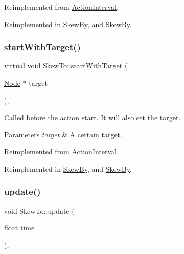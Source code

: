 Reimplemented from \hyperlink{classActionInterval_ad3d91186b2c3108488ddbbdbbd982484}{Action\+Interval}.



Reimplemented in \hyperlink{classSkewBy_aaf859fd8f95807064391ebeb6cd9243f}{Skew\+By}, and \hyperlink{classSkewBy_a8f9601dbf00d1a79972bcef59201bd32}{Skew\+By}.

\mbox{\label{classSkewTo_a16355f6807f0100f4e52ed8ad5e84116}} 
\subsubsection{\texorpdfstring{start\+With\+Target()}{startWithTarget()}\hspace{0.1cm}{\footnotesize\ttfamily [2/2]}}
{\footnotesize\ttfamily virtual void Skew\+To\+::start\+With\+Target (\begin{DoxyParamCaption}\item[{\hyperlink{classNode}{Node} $\ast$}]{target }\end{DoxyParamCaption})\hspace{0.3cm}{\ttfamily [override]}, {\ttfamily [virtual]}}

Called before the action start. It will also set the target.


\begin{DoxyParams}{Parameters}
{\em target} & A certain target. \\
\hline
\end{DoxyParams}


Reimplemented from \hyperlink{classActionInterval_ad3d91186b2c3108488ddbbdbbd982484}{Action\+Interval}.



Reimplemented in \hyperlink{classSkewBy_aaf859fd8f95807064391ebeb6cd9243f}{Skew\+By}, and \hyperlink{classSkewBy_a8f9601dbf00d1a79972bcef59201bd32}{Skew\+By}.

\mbox{\label{classSkewTo_ae307437cb6dee495f55dd350ccccd1c4}} 
\subsubsection{\texorpdfstring{update()}{update()}\hspace{0.1cm}{\footnotesize\ttfamily [1/2]}}
{\footnotesize\ttfamily void Skew\+To\+::update (\begin{DoxyParamCaption}\item[{float}]{time }\end{DoxyParamCaption})\hspace{0.3cm}{\ttfamily [override]}, {\ttfamily [virtual]}}


